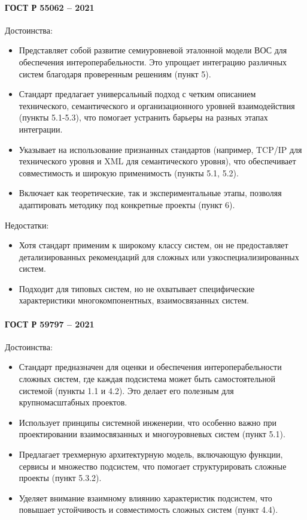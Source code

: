 \paragraph{ГОСТ Р 55062 -- 2021}

Достоинства:

\begin{itemize}
	\item Представляет собой развитие семиуровневой эталонной модели ВОС
		для обеспечения интероперабельности.
		Это упрощает интеграцию различных
		систем благодаря проверенным решениям (пункт 5).
	\item Стандарт предлагает универсальный подход
		с четким описанием технического, семантического
		и организационного уровней взаимодействия (пункты 5.1-5.3),
		что помогает устранить барьеры на разных этапах интеграции.
	\item Указывает на использование признанных стандартов
		(например, TCP/IP для технического уровня
		и XML для семантического уровня),
		что обеспечивает совместимость
		и широкую применимость (пункты 5.1, 5.2).
	\item Включает как теоретические, так и экспериментальные этапы,
		позволяя адаптировать методику под конкретные проекты (пункт 6).
\end{itemize}

Недостатки:

\begin{itemize}
	\item Хотя стандарт применим к широкому классу систем,
		он не предоставляет детализированных рекомендаций
		для сложных или узкоспециализированных систем.
	\item Подходит для типовых систем,
		но не охватывает специфические характеристики многокомпонентных,
		взаимосвязанных систем.
\end{itemize}

\paragraph{ГОСТ Р 59797 -- 2021}

Достоинства:

\begin{itemize}
	\item Стандарт предназначен для оценки
		и обеспечения интероперабельности сложных систем,
		где каждая подсистема может
		быть самостоятельной системой (пункты 1.1 и 4.2).
		Это делает его полезным для крупномасштабных проектов.
	\item Использует принципы системной инженерии,
		что особенно важно при проектировании взаимосвязанных
		и многоуровневых систем (пункт 5.1).
	\item Предлагает трехмерную архитектурную модель,
		включающую функции, сервисы и множество подсистем,
		что помогает структурировать сложные проекты (пункт 5.3.2).
	\item Уделяет внимание взаимному влиянию характеристик подсистем,
		что повышает устойчивость и совместимость сложных систем (пункт 4.4).
\end{itemize}

